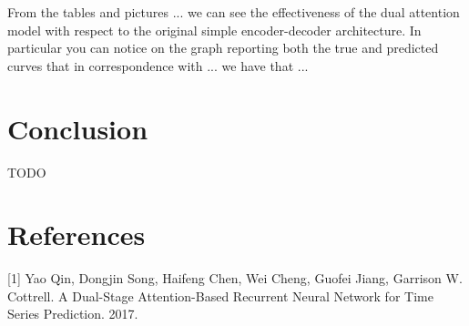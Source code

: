 \documentclass{article}
\begin{document}
From the tables and pictures ...
we can see the effectiveness of the dual attention model with respect to the 
original simple encoder-decoder architecture. In particular you can notice on 
the graph reporting both the true and predicted curves that in correspondence 
with ... we have that ...

\section{Conclusion}

TODO

\section*{References}

\small

[1] Yao Qin, Dongjin Song, Haifeng Chen, Wei Cheng, Guofei Jiang, Garrison W.
Cottrell. A Dual-Stage Attention-Based Recurrent Neural Network for Time Series
Prediction. 2017.
\end{document}
